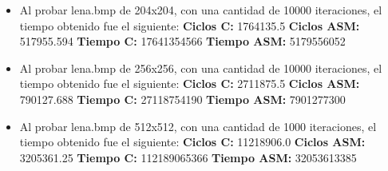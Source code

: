\documentclass[10pt, a4paper]{article}
\begin{document}
\begin{itemize}
\begin{itemize}
\item{Al probar lena.bmp de 204x204, con una cantidad de 10000 iteraciones, el tiempo obtenido fue el siguiente:\newline
\newline
\textbf{Ciclos C:}                 1764135.5\newline
\vspace{0.15cm}
\textbf{Ciclos ASM:}               517955.594\newline
\textbf{Tiempo C:}                 17641354566\newline
\textbf{Tiempo ASM:}               5179556052\newline}

\item{Al probar lena.bmp de 256x256, con una cantidad de 10000 iteraciones, el tiempo obtenido fue el siguiente:\newline
\newline
\textbf{Ciclos C:}                 2711875.5\newline
\vspace{0.15cm}
\textbf{Ciclos ASM:}                790127.688\newline
\textbf{Tiempo C:}                27118754190\newline
\textbf{Tiempo ASM:}                7901277300\newline}


\item{Al probar lena.bmp de 512x512, con una cantidad de 1000 iteraciones, el tiempo obtenido fue el siguiente:\newline
\newline
\textbf{Ciclos C:}                 11218906.0\newline
\vspace{0.15cm}
\textbf{Ciclos ASM:}               3205361.25\newline
\textbf{Tiempo C:}                 112189065366\newline
\textbf{Tiempo ASM:}               32053613385\newline}
\end{itemize}
\end{itemize}
\end{document}
